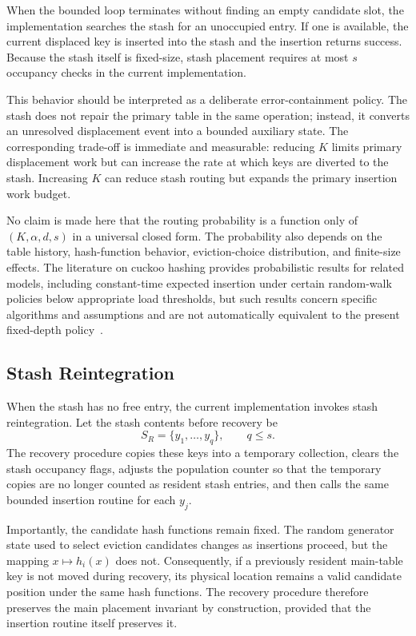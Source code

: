 \documentclass[conference]{IEEEtran}
\begin{document}
When the bounded loop terminates without finding an empty candidate slot, the implementation searches the stash for an unoccupied entry. If one is available, the current displaced key is inserted into the stash and the insertion returns success. Because the stash itself is fixed-size, stash placement requires at most $s$ occupancy checks in the current implementation.

This behavior should be interpreted as a deliberate error-containment policy. The stash does not repair the primary table in the same operation; instead, it converts an unresolved displacement event into a bounded auxiliary state. The corresponding trade-off is immediate and measurable: reducing $K$ limits primary displacement work but can increase the rate at which keys are diverted to the stash. Increasing $K$ can reduce stash routing but expands the primary insertion work budget.

No claim is made here that the routing probability is a function only of $(K,\alpha,d,s)$ in a universal closed form. The probability also depends on the table history, hash-function behavior, eviction-choice distribution, and finite-size effects. The literature on cuckoo hashing provides probabilistic results for related models, including constant-time expected insertion under certain random-walk policies below appropriate load thresholds, but such results concern specific algorithms and assumptions and are not automatically equivalent to the present fixed-depth policy~\cite{fountoulakis2010insertion,walzer2022insertion,bell2024constant}.

\subsection{Stash Reintegration}

When the stash has no free entry, the current implementation invokes stash reintegration. Let the stash contents before recovery be
\[
    S_R = \{y_1,\ldots,y_q\},
    \qquad q\le s.
\]
The recovery procedure copies these keys into a temporary collection, clears the stash occupancy flags, adjusts the population counter so that the temporary copies are no longer counted as resident stash entries, and then calls the same bounded insertion routine for each $y_j$.

Importantly, the candidate hash functions remain fixed. The random generator state used to select eviction candidates changes as insertions proceed, but the mapping $x\mapsto h_i(x)$ does not. Consequently, if a previously resident main-table key is not moved during recovery, its physical location remains a valid candidate position under the same hash functions. The recovery procedure therefore preserves the main placement invariant by construction, provided that the insertion routine itself preserves it.
\end{document}
